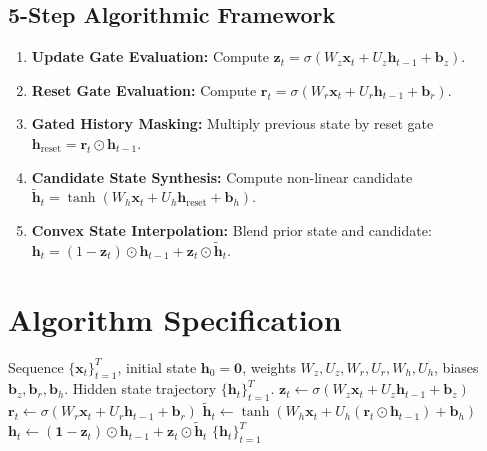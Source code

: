 \documentclass[11pt,a4paper]{article}
\theoremstyle{definition}
\begin{document}
\subsection{5-Step Algorithmic Framework}
\begin{enumerate}
    \item \textbf{Update Gate Evaluation:} Compute $\mathbf{z}_t = \sigma(W_z \mathbf{x}_t + U_z \mathbf{h}_{t-1} + \mathbf{b}_z)$.
    \item \textbf{Reset Gate Evaluation:} Compute $\mathbf{r}_t = \sigma(W_r \mathbf{x}_t + U_r \mathbf{h}_{t-1} + \mathbf{b}_r)$.
    \item \textbf{Gated History Masking:} Multiply previous state by reset gate $\mathbf{h}_{\text{reset}} = \mathbf{r}_t \odot \mathbf{h}_{t-1}$.
    \item \textbf{Candidate State Synthesis:} Compute non-linear candidate $\tilde{\mathbf{h}}_t = \tanh(W_h \mathbf{x}_t + U_h \mathbf{h}_{\text{reset}} + \mathbf{b}_h)$.
    \item \textbf{Convex State Interpolation:} Blend prior state and candidate: $\mathbf{h}_t = (1 - \mathbf{z}_t) \odot \mathbf{h}_{t-1} + \mathbf{z}_t \odot \tilde{\mathbf{h}}_t$.
\end{enumerate}

\section{Algorithm Specification}

\begin{algorithm}[H]
\caption{Gated Recurrent Unit (GRU) Step and Unrolling}
\label{alg:gru}
\begin{algorithmic}[1]
\Require Sequence $\{\mathbf{x}_t\}_{t=1}^T$, initial state $\mathbf{h}_0 = \mathbf{0}$, weights $W_z, U_z, W_r, U_r, W_h, U_h$, biases $\mathbf{b}_z, \mathbf{b}_r, \mathbf{b}_h$.
\Ensure Hidden state trajectory $\{\mathbf{h}_t\}_{t=1}^T$.
    \State $\mathbf{z}_t \gets \sigma(W_z \mathbf{x}_t + U_z \mathbf{h}_{t-1} + \mathbf{b}_z)$
    \State $\mathbf{r}_t \gets \sigma(W_r \mathbf{x}_t + U_r \mathbf{h}_{t-1} + \mathbf{b}_r)$
    \State $\tilde{\mathbf{h}}_t \gets \tanh(W_h \mathbf{x}_t + U_h (\mathbf{r}_t \odot \mathbf{h}_{t-1}) + \mathbf{b}_h)$
    \State $\mathbf{h}_t \gets (\mathbf{1} - \mathbf{z}_t) \odot \mathbf{h}_{t-1} + \mathbf{z}_t \odot \tilde{\mathbf{h}}_t$
\EndFor
\State \Return $\{\mathbf{h}_t\}_{t=1}^T$
\end{algorithmic}
\end{algorithm}
\end{document}
